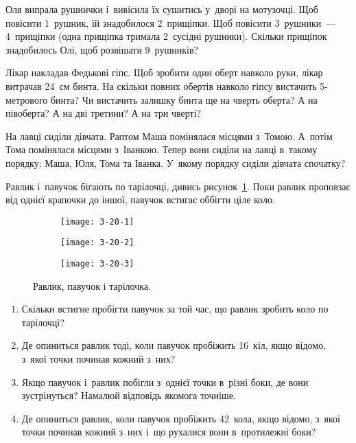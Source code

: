 \problem
Оля випрала рушнички і~вивісила їх сушитись у~дворі на мотузочці.
Щоб повісити 1~рушник, їй знадобилося 2~прищіпки.
Щоб повісити 3~рушники~--- 4~прищіпки (одна прищіпка тримала 2~сусідні рушники).
Скільки прищіпок знадобилось Олі, щоб розвішати 9~рушників?


\problem
Лікар накладав Федькові гіпс.
Щоб зробити один оберт навколо руки, лікар витрачав 24~см бинта.
На скільки повних обертів навколо гіпсу вистачить 5-метрового бинта?
Чи вистачить залишку бинта ще на чверть оберта?
А на півоберта?
А на дві третини?
А на три чверті?


\problem
На лавці сиділи дівчата. Раптом Маша помінялася місцями з~Томою.
А~потім Тома помінялася місцями з~Іванкою.
Тепер вони сиділи на лавці в~такому порядку: Маша, Юля, Тома та Іванка.
У~якому порядку сиділи дівчата спочатку?


\problem
{}
Равлик і~павучок бігають по тарілочці,
дивись рисунок~\ref{fig:snail-spider-plate}.
Поки равлик проповзає від однієї крапочки до іншої,
павучок встигає оббігти ціле коло.

\begin{figure}[ht]
  \centering
  \begin{subfigure}{0.2\textwidth}
    \texttt{[image: 3-20-1]}
  \end{subfigure}
  \quad
  \begin{subfigure}{0.4\textwidth}
    \texttt{[image: 3-20-2]}
  \end{subfigure}
  \quad
  \begin{subfigure}{0.2\textwidth}
    \texttt{[image: 3-20-3]}
  \end{subfigure}
  \caption{Равлик, павучок і тарілочка.}
  \label{fig:snail-spider-plate}
\end{figure}

\begin{enumerate}
  \item Скільки встигне пробігти павучок за той час,
  що равлик зробить коло по тарілочці?
  \item Де опиниться равлик тоді, коли павучок пробіжить 16~кіл,
  якщо відомо, з~якої точки починав кожний з~них?
  \item Якщо павучок і~равлик побігли з~однієї точки в~різні боки,
  де вони зустрінуться?
  Намалюй відповідь якомога точніше.
  \item Де опиниться равлик, коли павучок пробіжить 42~кола, якщо відомо,
  з~якої точки починав кожний з~них і~що рухалися вони в~протилежні боки?
\end{enumerate}


